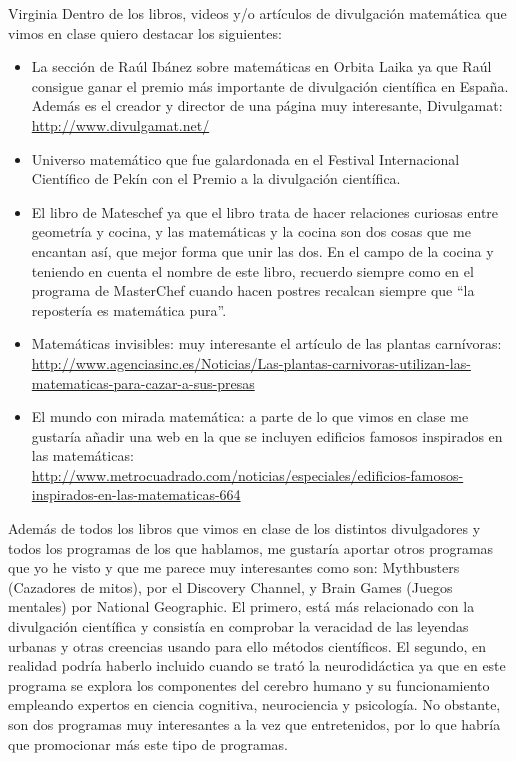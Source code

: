 \begin{opin}{\virgicolor}{Virginia}
Dentro de los libros, videos y/o artículos de divulgación matemática que vimos en clase quiero destacar los siguientes:

\begin{itemize}

\item La sección de Raúl Ibánez sobre matemáticas en Orbita Laika ya que Raúl consigue ganar el premio más importante de divulgación científica en España. Además es el creador y director de una página muy interesante, Divulgamat: \url{http://www.divulgamat.net/} 

\item Universo matemático que fue galardonada en el Festival Internacional Científico de Pekín con el Premio a la divulgación científica. 

\item El libro de Mateschef ya que el libro trata de hacer relaciones curiosas entre geometría y cocina, y las matemáticas y la cocina son dos cosas que me encantan así, que mejor forma que unir las dos. En el campo de la cocina y teniendo en cuenta el nombre de este libro, recuerdo siempre como en el programa de MasterChef cuando hacen postres recalcan siempre que “la repostería es matemática pura”. 

\item Matemáticas invisibles: muy interesante el artículo de las plantas carnívoras: \url{http://www.agenciasinc.es/Noticias/Las-plantas-carnivoras-utilizan-las-matematicas-para-cazar-a-sus-presas} 

\item El mundo con mirada matemática: a parte de lo que vimos en clase me gustaría añadir una web en la que se incluyen edificios famosos inspirados en las matemáticas: \url{http://www.metrocuadrado.com/noticias/especiales/edificios-famosos-inspirados-en-las-matematicas-664} 
\end{itemize}


Además de todos los libros que vimos en clase de los distintos divulgadores y todos los programas de los que hablamos, me gustaría aportar otros programas que yo he visto y que me parece muy interesantes como son: Mythbusters (Cazadores de mitos), por el Discovery Channel, y Brain Games (Juegos mentales) por National Geographic. El primero, está más relacionado con la divulgación científica y consistía en comprobar la veracidad de las leyendas urbanas y otras creencias usando para ello métodos científicos. El segundo, en realidad podría haberlo incluido cuando se trató la neurodidáctica ya que en este programa se explora los componentes del cerebro humano y su funcionamiento empleando expertos en ciencia cognitiva, neurociencia y psicología. No obstante, son dos programas muy interesantes a la vez que entretenidos, por lo que habría que promocionar más este tipo de programas.


\end{opin}
